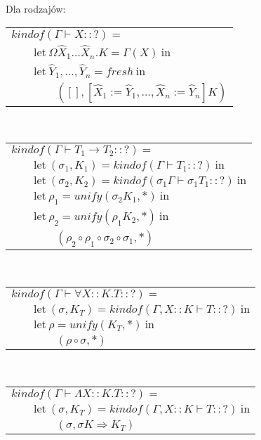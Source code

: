 \documentclass[11pt,leqno]{article}
\begin{document}
Dla rodzajów: \\
\begin{tabular}{l}
$kindof(\Gamma \vdash X :: ?) = $ \\
$\qquad \textrm{let} \ \Omega \widehat{X}_1 \dots \widehat{X}_n.K = \Gamma(X) \ \textrm{in} $ \\
$\qquad \textrm{let} \ \widehat{Y}_1, \dots, \widehat{Y}_n = fresh \ \textrm{in} $ \\
$\qquad\qquad ([], [\widehat{X}_1 := \widehat{Y}_1, \dots ,\widehat{X}_n := \widehat{Y}_n]K) $ \\
\end{tabular} \\
\begin{tabular}{l}
$kindof(\Gamma \vdash T_1 \rightarrow T_2 :: ?) = $ \\
$\qquad \textrm{let} \ (\sigma_1, K_1) = kindof(\Gamma \vdash T_1 :: ?) \ \textrm{in} $ \\
$\qquad \textrm{let} \ (\sigma_2, K_2) = kindof(\sigma_1 \Gamma \vdash \sigma_1 T_1 :: ?) \ \textrm{in} $ \\
$\qquad \textrm{let} \ \rho_1 = unify(\sigma_2 K_1, *) \ \textrm{in} $ \\
$\qquad \textrm{let} \ \rho_2 = unify(\rho_1 K_2, *) \ \textrm{in} $ \\
$\qquad\qquad (\rho_2 \circ \rho_1 \circ \sigma_2 \circ \sigma_1, *) $ \\
\end{tabular} \\
\begin{tabular}{l}
$kindof(\Gamma \vdash \forall X::K.T :: ?) = $ \\
$\qquad \textrm{let} \ (\sigma, K_T) = kindof(\Gamma, X::K \vdash T :: ?) \ \textrm{in} $ \\
$\qquad \textrm{let} \ \rho = unify(K_T, *) \ \textrm{in} $ \\
$\qquad\qquad (\rho \circ \sigma, *) $ \\
\end{tabular} \\
\begin{tabular}{l}
$kindof(\Gamma \vdash \Lambda X::K.T :: ?) = $ \\
$\qquad \textrm{let} \ (\sigma, K_T) = kindof(\Gamma, X::K \vdash T :: ?) \ \textrm{in} $ \\
$\qquad\qquad (\sigma, \sigma K \Rightarrow K_T) $ \\
\end{tabular} \\
\end{document}
